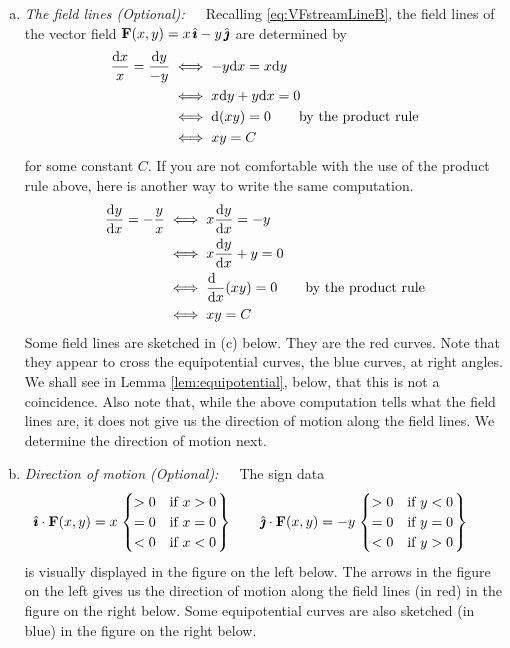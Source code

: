 \begin{eg}
\begin{enumerate}[(a)]
\item
\emph{The field lines (Optional):}\ \ \
Recalling \eqref{eq:VFstreamLineB},
the field lines of the vector field $\mathbf{F}(x,y) = x\,\hat{\pmb{\imath}}-y\,\hat{\pmb{\jmath}}$
are determined by
\begin{align*}
\frac{\mathrm{d}x}{x} = \frac{\mathrm{d}y}{-y}
&\iff -y\mathrm{d}x = x\mathrm{d}y \\
&\iff x\mathrm{d}y + y\mathrm{d}x = 0 \\
&\iff \mathrm{d}(xy) = 0 \qquad\text{by the product rule} \\
&\iff xy = C
\end{align*}
for some constant $C$. If you are not comfortable with the use
of the product rule above, here is another way to write the
same computation.
\begin{align*}
\diff{y}{x}=-\frac{y}{x}
&\iff  x\diff{y}{x} = -y \\
&\iff x\diff{y}{x} +y = 0 \\
&\iff \diff{\hfill}{x}(xy) = 0 \qquad\text{by the product rule} \\
&\iff xy = C
\end{align*}
Some field lines are sketched in (c) below.
They are the red curves. Note that they appear to cross the equipotential 
curves, the blue curves, at right angles. We shall see in 
Lemma \ref{lem:equipotential}, below, that this is not a coincidence.
Also note that, while the above computation tells what the field lines
are, it does not give us the direction of motion along the field lines.
We determine the direction of motion next. 

\item 
\emph{Direction of motion (Optional):}\ \ \ 
The sign data
\begin{align*}
\hat{\pmb{\imath}}\cdot\mathbf{F}(x,y) = x
    \left.\begin{cases}
             >0 &\text{if $x>0$} \\
             =0 &\text{if $x=0$} \\
             <0 &\text{if $x<0$} 
       \end{cases}\right\}\qquad
\hat{\pmb{\jmath}}\cdot\mathbf{F}(x,y) = -y
    \left.\begin{cases}
             >0 &\text{if $y<0$} \\
             =0 &\text{if $y=0$} \\
             <0 &\text{if $y>0$} 
       \end{cases}\right\}\qquad
\end{align*}
is visually displayed in the figure on the left below. The arrows in the
figure on the left gives us the direction of motion along 
the field lines (in red) in the figure on the right below.
Some equipotential curves are also sketched (in blue) in the figure 
on the right below.


\end{enumerate}
\end{eg}
